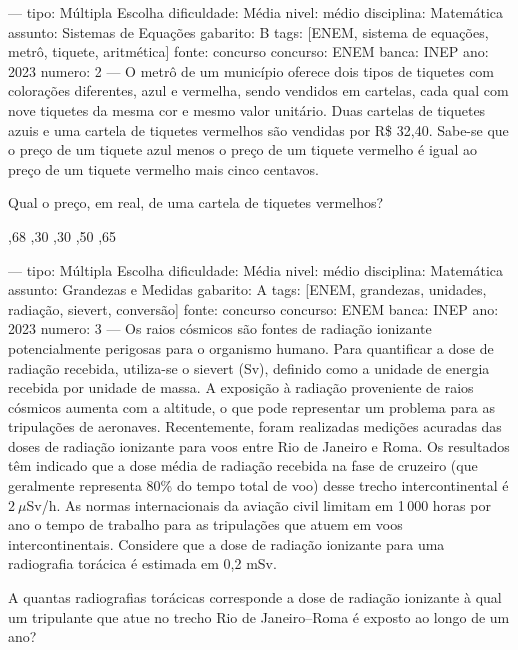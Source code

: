 
---
tipo: Múltipla Escolha
dificuldade: Média
nivel: médio
disciplina: Matemática
assunto: Sistemas de Equações
gabarito: B
tags: [ENEM, sistema de equações, metrô, tiquete, aritmética]
fonte: concurso
concurso: ENEM
banca: INEP
ano: 2023
numero: 2
---
\question
O metrô de um município oferece dois tipos de tiquetes com colorações diferentes, azul e vermelha, sendo vendidos em cartelas, cada qual com nove tiquetes da mesma cor e mesmo valor unitário. Duas cartelas de tiquetes azuis e uma cartela de tiquetes vermelhos são vendidas por R\$ 32,40. Sabe-se que o preço de um tiquete azul menos o preço de um tiquete vermelho é igual ao preço de um tiquete vermelho mais cinco centavos.

Qual o preço, em real, de uma cartela de tiquetes vermelhos?
\begin{choices}
,68
,30
,30
,50
,65
\end{choices}

---
tipo: Múltipla Escolha
dificuldade: Média
nivel: médio
disciplina: Matemática
assunto: Grandezas e Medidas
gabarito: A
tags: [ENEM, grandezas, unidades, radiação, sievert, conversão]
fonte: concurso
concurso: ENEM
banca: INEP
ano: 2023
numero: 3
---
\question
Os raios cósmicos são fontes de radiação ionizante potencialmente perigosas para o organismo humano. Para quantificar a dose de radiação recebida, utiliza-se o sievert (Sv), definido como a unidade de energia recebida por unidade de massa. A exposição à radiação proveniente de raios cósmicos aumenta com a altitude, o que pode representar um problema para as tripulações de aeronaves. Recentemente, foram realizadas medições acuradas das doses de radiação ionizante para voos entre Rio de Janeiro e Roma. Os resultados têm indicado que a dose média de radiação recebida na fase de cruzeiro (que geralmente representa 80\% do tempo total de voo) desse trecho intercontinental é $2\ \mu$Sv/h. As normas internacionais da aviação civil limitam em 1\,000 horas por ano o tempo de trabalho para as tripulações que atuem em voos intercontinentais. Considere que a dose de radiação ionizante para uma radiografia torácica é estimada em 0,2 mSv.

A quantas radiografias torácicas corresponde a dose de radiação ionizante à qual um tripulante que atue no trecho Rio de Janeiro--Roma é exposto ao longo de um ano?
\begin{choices}
\end{choices}

